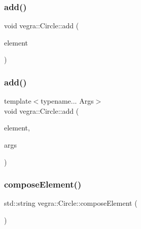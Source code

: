 \mbox{\label{structvegra_1_1Circle_acf78b38e6f133931c4963652db3b382b}} 
\subsubsection{\texorpdfstring{add()}{add()}\hspace{0.1cm}{\footnotesize\ttfamily [2/3]}}
{\footnotesize\ttfamily void vegra\+::\+Circle\+::add (\begin{DoxyParamCaption}\item[{\mbox{\hyperlink{structvegra_1_1SVGElement}{vegra\+::\+S\+V\+G\+Element}} $\ast$}]{element }\end{DoxyParamCaption})\hspace{0.3cm}{\ttfamily [inline]}}

\mbox{\label{structvegra_1_1Circle_a5e6f8b011ad3083ef2f3b8a731f96c7d}} 
\subsubsection{\texorpdfstring{add()}{add()}\hspace{0.1cm}{\footnotesize\ttfamily [3/3]}}
{\footnotesize\ttfamily template$<$typename... Args$>$ \\
void vegra\+::\+Circle\+::add (\begin{DoxyParamCaption}\item[{\mbox{\hyperlink{structvegra_1_1SVGElement}{vegra\+::\+S\+V\+G\+Element}} $\ast$}]{element,  }\item[{Args...}]{args }\end{DoxyParamCaption})\hspace{0.3cm}{\ttfamily [inline]}}

\mbox{\label{structvegra_1_1Circle_ad32a663886487547c33ebeef6449c19a}} 
\subsubsection{\texorpdfstring{compose\+Element()}{composeElement()}}
{\footnotesize\ttfamily std\+::string vegra\+::\+Circle\+::compose\+Element (\begin{DoxyParamCaption}{ }\end{DoxyParamCaption})\hspace{0.3cm}{\ttfamily [inline]}}

